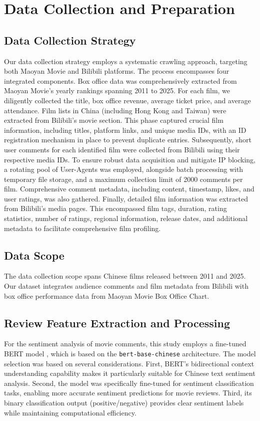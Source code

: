 \documentclass{article}
\begin{document}
\section{Data Collection and Preparation}
\subsection{Data Collection Strategy}
Our data collection strategy employs a systematic crawling approach, targeting both Maoyan Movie and Bilibili platforms. The process encompasses four integrated components. Box office data was comprehensively extracted from Maoyan Movie's yearly rankings spanning 2011 to 2025. For each film, we diligently collected the title, box office revenue, average ticket price, and average attendance. Film lists in China (including Hong Kong and Taiwan) were extracted from Bilibili's movie section. This phase captured crucial film information, including titles, platform links, and unique media IDs, with an ID registration mechanism in place to prevent duplicate entries. Subsequently, short user comments for each identified film were collected from Bilibili using their respective media IDs. To ensure robust data acquisition and mitigate IP blocking, a rotating pool of User-Agents was employed, alongside batch processing with temporary file storage, and a maximum collection limit of 2000 comments per film. Comprehensive comment metadata, including content, timestamp, likes, and user ratings, was also gathered. Finally, detailed film information was extracted from Bilibili's media pages. This encompassed film tags, duration, rating statistics, number of ratings, regional information, release dates, and additional metadata to facilitate comprehensive film profiling.

\subsection{Data Scope}
The data collection scope spans Chinese films released between 2011 and 2025. Our dataset integrates audience comments and film metadata from Bilibili with box office performance data from Maoyan Movie Box Office Chart.


\subsection{Review Feature Extraction and Processing}
For the sentiment analysis of movie comments, this study employs a fine-tuned BERT model \cite{left0ver_bert_sentiment}, which is based on the \texttt{bert-base-chinese} architecture. The model selection was based on several considerations. First, BERT's bidirectional context understanding capability makes it particularly suitable for Chinese text sentiment analysis. Second, the model was specifically fine-tuned for sentiment classification tasks, enabling more accurate sentiment predictions for movie reviews. Third, its binary classification output (positive/negative) provides clear sentiment labels while maintaining computational efficiency.
\end{document}
